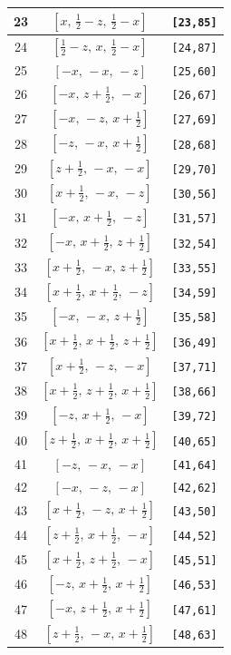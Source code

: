 \documentclass[fleqn,8pt]{jsarticle}
\begin{document}
\begin{longtable}{ccc}
23 & $\left[ x,\, \frac{1}{2} - z,\, \frac{1}{2} - x \right]$ & {\tt [23,85]} \\ \hline
24 & $\left[ \frac{1}{2} - z,\, x,\, \frac{1}{2} - x \right]$ & {\tt [24,87]} \\ \hline
25 & $\left[ - x,\, - x,\, - z \right]$ & {\tt [25,60]} \\ \hline
26 & $\left[ - x,\, z + \frac{1}{2},\, - x \right]$ & {\tt [26,67]} \\ \hline
27 & $\left[ - x,\, - z,\, x + \frac{1}{2} \right]$ & {\tt [27,69]} \\ \hline
28 & $\left[ - z,\, - x,\, x + \frac{1}{2} \right]$ & {\tt [28,68]} \\ \hline
29 & $\left[ z + \frac{1}{2},\, - x,\, - x \right]$ & {\tt [29,70]} \\ \hline
30 & $\left[ x + \frac{1}{2},\, - x,\, - z \right]$ & {\tt [30,56]} \\ \hline
31 & $\left[ - x,\, x + \frac{1}{2},\, - z \right]$ & {\tt [31,57]} \\ \hline
32 & $\left[ - x,\, x + \frac{1}{2},\, z + \frac{1}{2} \right]$ & {\tt [32,54]} \\ \hline
33 & $\left[ x + \frac{1}{2},\, - x,\, z + \frac{1}{2} \right]$ & {\tt [33,55]} \\ \hline
34 & $\left[ x + \frac{1}{2},\, x + \frac{1}{2},\, - z \right]$ & {\tt [34,59]} \\ \hline
35 & $\left[ - x,\, - x,\, z + \frac{1}{2} \right]$ & {\tt [35,58]} \\ \hline
36 & $\left[ x + \frac{1}{2},\, x + \frac{1}{2},\, z + \frac{1}{2} \right]$ & {\tt [36,49]} \\ \hline
37 & $\left[ x + \frac{1}{2},\, - z,\, - x \right]$ & {\tt [37,71]} \\ \hline
38 & $\left[ x + \frac{1}{2},\, z + \frac{1}{2},\, x + \frac{1}{2} \right]$ & {\tt [38,66]} \\ \hline
39 & $\left[ - z,\, x + \frac{1}{2},\, - x \right]$ & {\tt [39,72]} \\ \hline
40 & $\left[ z + \frac{1}{2},\, x + \frac{1}{2},\, x + \frac{1}{2} \right]$ & {\tt [40,65]} \\ \hline
41 & $\left[ - z,\, - x,\, - x \right]$ & {\tt [41,64]} \\ \hline
42 & $\left[ - x,\, - z,\, - x \right]$ & {\tt [42,62]} \\ \hline
43 & $\left[ x + \frac{1}{2},\, - z,\, x + \frac{1}{2} \right]$ & {\tt [43,50]} \\ \hline
44 & $\left[ z + \frac{1}{2},\, x + \frac{1}{2},\, - x \right]$ & {\tt [44,52]} \\ \hline
45 & $\left[ x + \frac{1}{2},\, z + \frac{1}{2},\, - x \right]$ & {\tt [45,51]} \\ \hline
46 & $\left[ - z,\, x + \frac{1}{2},\, x + \frac{1}{2} \right]$ & {\tt [46,53]} \\ \hline
47 & $\left[ - x,\, z + \frac{1}{2},\, x + \frac{1}{2} \right]$ & {\tt [47,61]} \\ \hline
48 & $\left[ z + \frac{1}{2},\, - x,\, x + \frac{1}{2} \right]$ & {\tt [48,63]} \\
\end{longtable}
\end{document}

